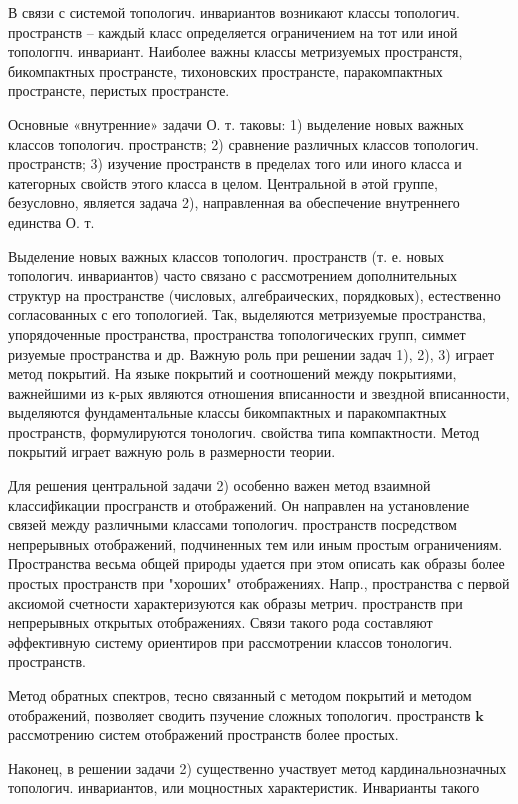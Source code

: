 \documentclass[10pt]{article}
\begin{document}
В связи с системой топологич. инвариантов возникают классы топологич. пространств -- каждый класс определяется ограничением на тот или иной топологпч. инвариант. Наиболее важны классы метризуемых пространстя, бикомпактных пространсте, тихоновских пространсте, паракомпактных пространсте, перистых пространсте.



Основные «внутренние» задачи О. т. таковы: 1) выделение новых важных классов топологич. пространств; 2) сравнение различных классов топологич. пространств; 3) изучение пространств в пределах того или иного класса и категорных свойств этого класса в целом. Центральной в әтой группе, безусловно, является задача 2), направленная ва обеспечение внутреннего единства О. т.



Выделение новых важных классов топологич. пространств (т. е. новых топологич. инвариантов) часто связано с рассмотрением дополнительных структур на пространстве (числовых, алгебраических, порядковых), естественно согласованных с его топологией. Так, выделяются метризуемые пространства, упорядоченные пространства, пространства топологических групп, симмет ризуемые пространства и др. Важную роль при решении задач 1), 2), 3) играет метод покрытий. На языке покрытий и соотношений между покрытиями, важнейшими из к-рых являются отношения вписанности и звездной вписанности, выделяются фундаментальные классы бикомпактных и паракомпактных пространств, формулируются тонологич. свойства типа компактности. Метод покрытий играет важную роль в размерности теории.



Для решения центральной задачи 2) особенно важен метод взаимной классиф̆икации просгранств и отображений. Он направлен на установление связей между различными классами топологич. пространств посредством непрерывных отображений, подчиненных тем или иным простым ограничениям. Пространства весьма общей природы удается при этом описать как образы более простых пространств при "хороших" отображениях. Напр., пространства с первой аксиомой счетности характеризуются как образы метрич. пространств при непрерывных открытых отображениях. Связи такого рода составляют әффективную систему ориентиров при рассмотрении классов тонологич. пространств.



Метод обратных спектров, тесно связанный с методом покрытий и методом отображений, позволяет сводить пзучение сложных топологич. пространств $\mathbf{k}$ рассмотрению систем отображений пространств более простых.



Наконец, в решении задачи 2) существенно участвует метод кардинальнозначных топологич. инвариантов, или моцностных характеристик. Инварианты такого
\end{document}
